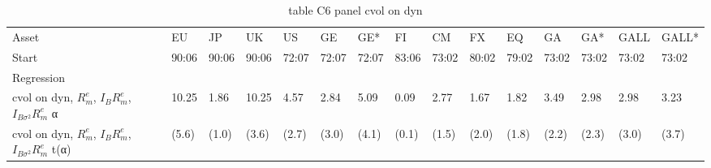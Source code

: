 \begin{table}[htbp]
  \centering
  \caption{table C6 panel cvol on dyn}
  \label{tab:table_C6_panel_cvol_on_dyn}
  \begin{tabular}{lllllllllllllll}
\toprule
Asset & EU & JP & UK & US & GE & GE* & FI & CM & FX & EQ & GA & GA* & GALL & GALL* \\
Start & 90:06 & 90:06 & 90:06 & 72:07 & 72:07 & 72:07 & 83:06 & 73:02 & 80:02 & 79:02 & 73:02 & 73:02 & 73:02 & 73:02 \\
Regression &  &  &  &  &  &  &  &  &  &  &  &  &  &  \\
\midrule
cvol on dyn, $R^e_m$, $I_B R^e_m$, $I_{B\sigma^2} R^e_m$ α & 10.25 & 1.86 & 10.25 & 4.57 & 2.84 & 5.09 & 0.09 & 2.77 & 1.67 & 1.82 & 3.49 & 2.98 & 2.98 & 3.23 \\
cvol on dyn, $R^e_m$, $I_B R^e_m$, $I_{B\sigma^2} R^e_m$ t(α) & (5.6) & (1.0) & (3.6) & (2.7) & (3.0) & (4.1) & (0.1) & (1.5) & (2.0) & (1.8) & (2.2) & (2.3) & (3.0) & (3.7) \\
\bottomrule
\end{tabular}

\end{table}

